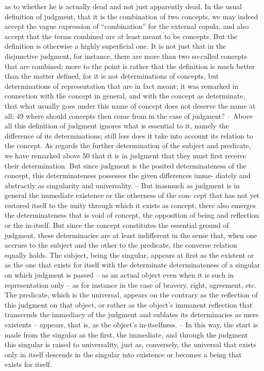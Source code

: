 as to whether he is actually dead and not just apparently dead.
In the usual definition of judgment, that it is the combination of two
concepts, we may indeed accept the vague expression of “combination” for
the external copula, and also accept that the terms combined are at least
meant to be concepts. But the definition is otherwise a highly superficial
one. It is not just that in the disjunctive judgment, for instance, there are
more than two so-called concepts that are combined; more to the point is
rather that the definition is much better than the matter defined, for it is not
determinations of concepts, but determinations of representation that are in
fact meant; it was remarked in connection with the concept in general, and
with the concept as determinate, that what usually goes under this name
of concept does not deserve the name at all; 49 where should concepts then
come from in the case of judgment? – Above all this definition of judgment
ignores what is essential to it, namely the difference of its determinations;
still less does it take into account its relation to the concept.
As regards the further determination of the subject and predicate, we
have remarked above 50 that it is in judgment that they must first receive
their determination. But since judgment is the posited determinateness
of the concept, this determinateness possesses the given differences imme-
diately and abstractly as singularity and universality. – But inasmuch as
judgment is in general the immediate existence or the otherness of the con-
cept that has not yet restored itself to the unity through which it exists as
concept, there also emerges the determinateness that is void of concept,
the opposition of being and reflection or the in-itself. But since the concept
constitutes the essential ground of judgment, these determinacies are at least
indifferent in the sense that, when one accrues to the subject and the other
to the predicate, the converse relation equally holds. The subject, being
the singular, appears at first as the existent or as the one that exists for itself
with the determinate determinateness of a singular on which judgment is
passed – as an actual object even when it is such in representation only –
as for instance in the case of bravery, right, agreement, etc. The predicate,
which is the universal, appears on the contrary as the reflection of this
judgment on that object, or rather as the object's immanent reflection that
transcends the immediacy of the judgment and sublates its determinacies
as mere existents – appears, that is, as the object's in-itselfness. – In this way,
the start is made from the singular as the first, the immediate, and through
the judgment this singular is raised to universality, just as, conversely, the
universal that exists only in itself descends in the singular into existence or
becomes a being that exists for itself.

